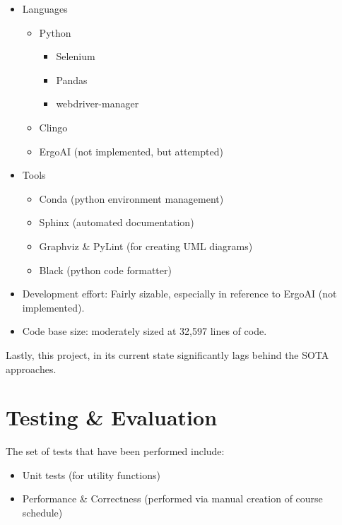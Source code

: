 \documentclass[12pt]{article}
\begin{document}
    \begin{itemize}
        \item Languages
        \begin{itemize}
            \item Python
            \begin{itemize}
                \item Selenium
                \item Pandas
                \item webdriver-manager
            \end{itemize}
            \item Clingo
            \item ErgoAI (not implemented, but attempted)
        \end{itemize}
        \item Tools
            \begin{itemize}
                \item Conda (python environment management)
                \item Sphinx (automated documentation)
                \item Graphviz \& PyLint (for creating UML diagrams)
                \item Black (python code formatter)
            \end{itemize}
        \item Development effort: Fairly sizable, especially in reference to ErgoAI (not implemented).
        \item Code base size: moderately sized at 32,597 lines of code.
    \end{itemize}

    Lastly, this project, in its current state significantly lags behind the SOTA approaches.
    
    \section{Testing \& Evaluation}
    \label{sec:test-eval}


    The set of tests that have been performed include: 

    \begin{itemize}
        \item Unit tests (for utility functions)
        \item Performance \& Correctness (performed via manual creation of course schedule)
    \end{itemize}
    
\end{document}
